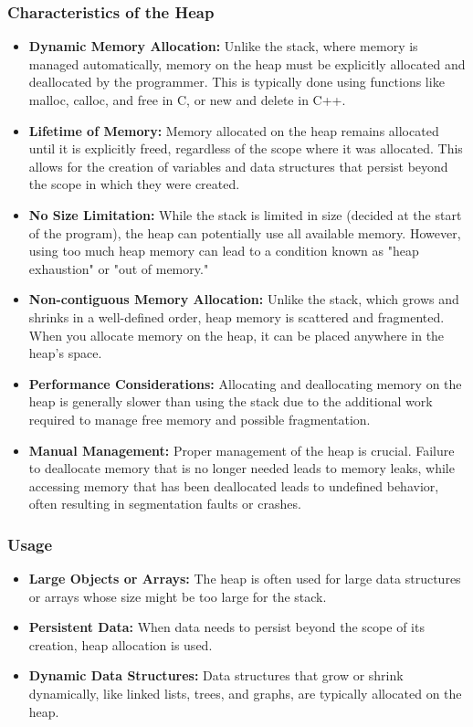 \documentclass{report}
\begin{document}
    \subsubsection{Characteristics of the Heap}
    \begin{itemize}
        \item \textbf{Dynamic Memory Allocation:} Unlike the stack, where memory is managed automatically, memory on the heap must be explicitly allocated and deallocated by the programmer. This is typically done using functions like malloc, calloc, and free in C, or new and delete in C++.
        \item \textbf{Lifetime of Memory:} Memory allocated on the heap remains allocated until it is explicitly freed, regardless of the scope where it was allocated. This allows for the creation of variables and data structures that persist beyond the scope in which they were created.
        \item \textbf{No Size Limitation:} While the stack is limited in size (decided at the start of the program), the heap can potentially use all available memory. However, using too much heap memory can lead to a condition known as "heap exhaustion" or "out of memory."
        \item \textbf{Non-contiguous Memory Allocation:} Unlike the stack, which grows and shrinks in a well-defined order, heap memory is scattered and fragmented. When you allocate memory on the heap, it can be placed anywhere in the heap's space.
        \item \textbf{Performance Considerations:} Allocating and deallocating memory on the heap is generally slower than using the stack due to the additional work required to manage free memory and possible fragmentation.
        \item \textbf{Manual Management:} Proper management of the heap is crucial. Failure to deallocate memory that is no longer needed leads to memory leaks, while accessing memory that has been deallocated leads to undefined behavior, often resulting in segmentation faults or crashes.
    \end{itemize}

    \bigbreak \noindent 
    \subsubsection{Usage}
    \begin{itemize}
        \item \textbf{Large Objects or Arrays:} The heap is often used for large data structures or arrays whose size might be too large for the stack.
        \item \textbf{Persistent Data:} When data needs to persist beyond the scope of its creation, heap allocation is used.
        \item \textbf{Dynamic Data Structures:} Data structures that grow or shrink dynamically, like linked lists, trees, and graphs, are typically allocated on the heap.
    \end{itemize}
\end{document}
